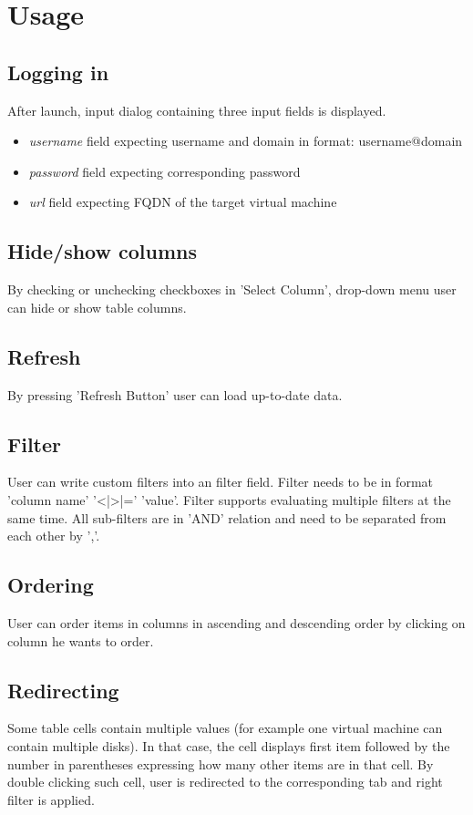 \section{Usage}
\subsection*{Logging in}
After launch, input dialog containing three input fields is displayed.
\begin{itemize}
\item \emph{username} field expecting username and domain in format: username@domain
\item \emph{password} field expecting corresponding password
\item \emph{url} field expecting FQDN of the target virtual machine
\end{itemize}

\subsection*{Hide/show columns}
By checking or unchecking checkboxes in 'Select Column', drop-down menu user can hide or show table columns.

\subsection*{Refresh}
By pressing 'Refresh Button' user can load up-to-date data.

\subsection*{Filter}
User can write custom filters into an filter field. Filter needs to be in format 'column name' '<|>|=' 'value'. Filter supports evaluating multiple filters at the same time. All sub-filters are in 'AND' relation and need to be separated from each other by ','.

\subsection*{Ordering}
User can order items in columns in ascending and descending order by clicking on column he wants to order.

\subsection*{Redirecting}
Some table cells contain multiple values (for example one virtual machine can contain multiple disks). In that case, the cell displays first item followed by the number in parentheses expressing how many other items are in that cell. By double clicking such cell, user is redirected to the corresponding tab and right filter is applied.

